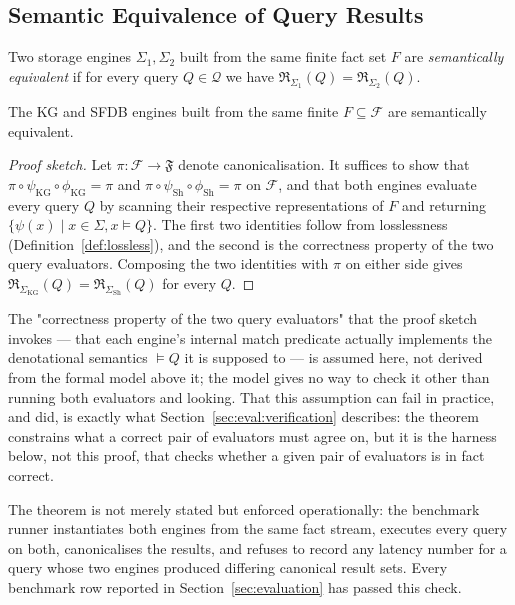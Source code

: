 \subsection{Semantic Equivalence of Query Results}
\label{sec:correctness:equivalence}

\begin{definition}
\label{def:semanticequiv}
Two storage engines $\Sigma_1, \Sigma_2$ built from the same finite fact set
$F$ are \emph{semantically equivalent} if for every query $Q \in \mathcal{Q}$
we have $\mathfrak{R}_{\Sigma_1}(Q) = \mathfrak{R}_{\Sigma_2}(Q)$.
\end{definition}

\begin{theorem}
\label{thm:equivalence}
The KG and SFDB engines built from the same finite $F \subseteq \mathcal{F}$
are semantically equivalent.
\end{theorem}

\begin{proof}[Proof sketch]
Let $\pi: \mathcal{F} \to \mathfrak{F}$ denote canonicalisation. It suffices
to show that $\pi \circ \psi_{\mathrm{KG}} \circ \phi_{\mathrm{KG}} = \pi$ and
$\pi \circ \psi_{\mathrm{Sh}} \circ \phi_{\mathrm{Sh}} = \pi$ on
$\mathcal{F}$, and that both engines evaluate every query $Q$ by scanning
their respective representations of $F$ and returning
$\{\psi(x) \mid x \in \Sigma, x \models Q\}$. The first two identities follow
from losslessness (Definition~\ref{def:lossless}), and the second is the
correctness property of the two query evaluators. Composing the two identities
with $\pi$ on either side gives
$\mathfrak{R}_{\Sigma_{\mathrm{KG}}}(Q) = \mathfrak{R}_{\Sigma_{\mathrm{Sh}}}(Q)$
for every $Q$.
\end{proof}

The "correctness property of the two query evaluators" that the proof
sketch invokes --- that each engine's internal match predicate actually
implements the denotational semantics $\models Q$ it is supposed to ---
is assumed here, not derived from the formal model above it; the model
gives no way to check it other than running both evaluators and looking.
That this assumption can fail in practice, and did, is exactly what
Section~\ref{sec:eval:verification} describes: the theorem constrains
what a correct pair of evaluators must agree on, but it is the harness
below, not this proof, that checks whether a given pair of evaluators is
in fact correct.

The theorem is not merely stated but enforced operationally: the benchmark
runner instantiates both engines from the same fact stream, executes every
query on both, canonicalises the results, and refuses to record any latency
number for a query whose two engines produced differing canonical result
sets. Every benchmark row reported in Section~\ref{sec:evaluation} has passed
this check.

